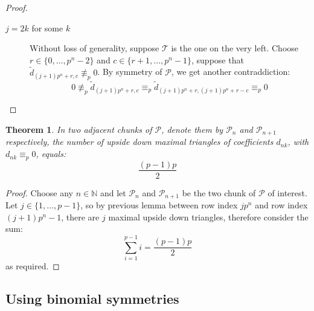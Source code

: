 \documentclass[10pt,a4paper]{article} %
\newtheorem{theorem}{Theorem}[section]
\begin{document}
\begin{proof}
\begin{itemize}
\begin{description}
                    \item[$j=2k$ for some $k$] Without loss of generality, suppose  $\mathcal{T}$ is the one on the very left. 
                    Choose $r \in\lbrace 0,\ldots,p^n-2\rbrace$ and $c \in\lbrace r+1,\ldots,p^n-1\rbrace$,
                    suppose that $\tilde{d}_{(j+1) p^n +r, c}\not\equiv_{p}0$. By symmetry of $\mathcal{P}$, we get another contraddiction: 
                    \begin{displaymath}
                        0\not\equiv_{p}\tilde{d}_{(j+1) p^n +r, c} \equiv_{p} \tilde{d}_{(j+1) p^n +r, (j+1) p^n +r-c}\equiv_{p}0
                    \end{displaymath}
                \end{description}
        \end{itemize}
    \end{proof}
    

    \begin{theorem}
        In two adjacent chunks of $\mathcal{P}$, denote them by $\mathcal{P}_n$
        and $\mathcal{P}_{n+1}$ respectively, the
        number of upside down maximal triangles of coefficients $d_{nk}$, with
        $d_{nk} \equiv_p 0$, equals:
        \begin{displaymath}
            \frac{(p-1)p}{2}
        \end{displaymath}
    \end{theorem}

    \begin{proof}
        Choose any $n\in\mathbb{N}$ and let $\mathcal{P}_n$ and $\mathcal{P}_{n+1}$
        be the two chunk of $\mathcal{P}$ of interest. Let $j\in\lbrace 1, \ldots, p-1 \rbrace$, so
        by previous lemma between row index $j p^n$ and
        row index $(j+1)p^n -1$, there are $j$ maximal upside down triangles, therefore consider the sum:
        \begin{displaymath}
            \sum_{i=1}^{p-1}{i} = \frac{(p-1)p}{2}
        \end{displaymath}
        as required.

    \end{proof}

    \subsection{Using binomial symmetries}
\end{document}
